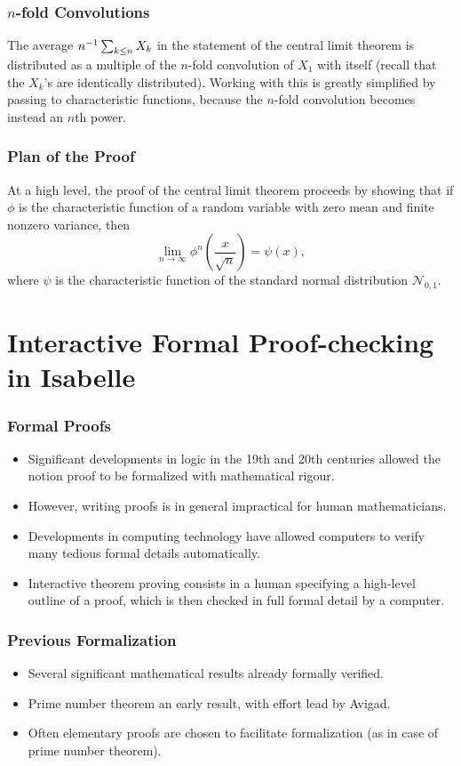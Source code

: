 \documentclass{beamer}
\begin{document}
\begin{frame}
\frametitle{$n$-fold Convolutions}
The average $n^{-1} \sum_{k \le n} X_k$ in the statement of the central limit theorem is distributed as a multiple of the $n$-fold convolution of $X_1$ with itself (recall that the $X_k$'s are identically distributed). \pause Working with this is greatly simplified by passing to characteristic functions, because the $n$-fold convolution becomes instead an $n$th power.
\end{frame}

\begin{frame}
\frametitle{Plan of the Proof}
At a high level, the proof of the central limit theorem proceeds by showing that if $\phi$ is the characteristic function of a random variable with zero mean and finite nonzero variance, then
\[ \lim_{n \rightarrow \infty} \phi^n\left(\frac{x}{\sqrt n}\right) = \psi(x), \]
where $\psi$ is the characteristic function of the standard normal distribution $\mathcal N_{0,1}$.
\end{frame}

\section{Interactive Formal Proof-checking in Isabelle}

\begin{frame}
\frametitle{Formal Proofs}
\begin{itemize}
\item Significant developments in logic in the 19th and 20th centuries allowed the notion proof to be formalized with mathematical rigour. \pause
\item However, writing proofs is in general impractical for human mathematicians. \pause
\item Developments in computing technology have allowed computers to verify many tedious formal details automatically. \pause
\item Interactive theorem proving consists in a human specifying a high-level outline of a proof, which is then checked in full formal detail by a computer.
\end{itemize}
\end{frame}

\begin{frame}
\frametitle{Previous Formalization}
\begin{itemize}
\item Several significant mathematical results already formally verified. \pause
\item Prime number theorem an early result, with effort lead by Avigad. \pause
\item Often elementary proofs are chosen to facilitate formalization (as in case of prime number theorem).
\end{itemize}
\end{frame}
\end{document}
